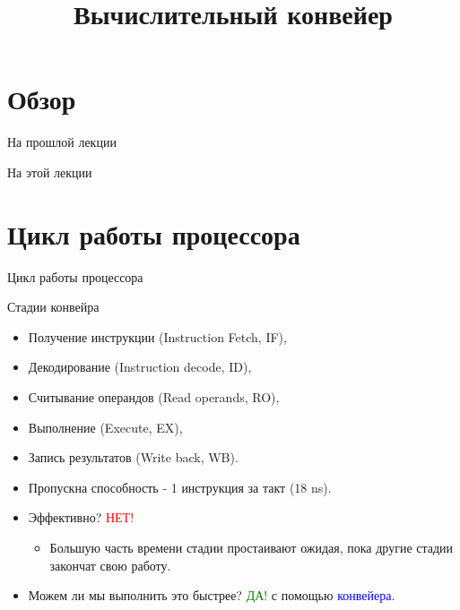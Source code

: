 

\title{Вычислительный конвейер}



\begin{frame}
\titlepage
\end{frame}

\section*{Обзор}

\begin{frame}{На прошлой лекции}
\end{frame}

\begin{frame}{На этой лекции}
\tableofcontents
\end{frame}

\section{Цикл работы процессора}

\begin{frame}{Цикл работы процессора}
\centering
{}
\end{frame}

\begin{frame}{Стадии конвейра}
\begin{itemize}
    \item Получение инструкции (Instruction Fetch, IF),
    \item Декодирование (Instruction decode, ID),
    \item Считывание операндов (Read operands, RO),
    \item Выполнение (Execute, EX),
    \item Запись результатов (Write back, WB).
\end{itemize}
\end{frame}

\begin{frame}
\vfill
\centering
{}
\pause\vfill
\begin{itemize}
    \item Пропускна способность - 1 инструкция за такт (18 ns).\pause
    \item Эффективно? \pause\textcolor{red}{НЕТ!}
    \begin{itemize}
        \item Большую часть времени стадии простаивают ожидая, пока другие стадии закончат свою работу.\pause
    \end{itemize}
    \item Можем ли мы выполнить это быстрее? \pause\textcolor{green}{ДА!} с помощью \textcolor{blue}{конвейера}.
\end{itemize}
\end{frame}

